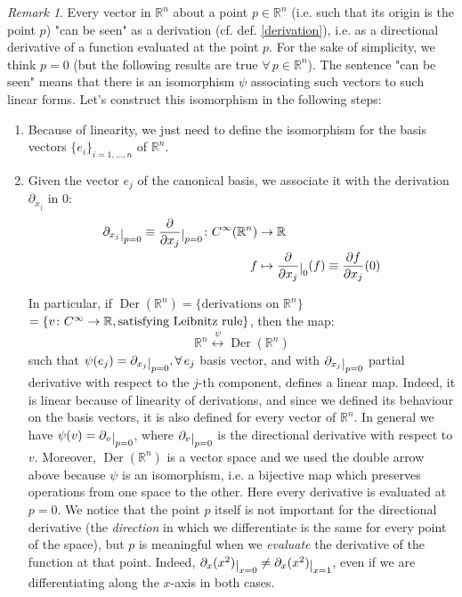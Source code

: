 \documentclass[a4paper,11pt,titlepage]{article}
\numberwithin{equation}{section}
\theoremstyle{definition}
\theoremstyle{remark}
\newtheorem{remark}[theorem]{Remark}
\DeclareMathOperator{\Der}{Der}
\newcommand{\rfield}{\mathbb{R}}
\newcommand{\restrict}[2]{{#1}\raisebox{-.5ex}{$|$}_{#2}}
\begin{document}
\begin{remark}\label{vectorasder}
Every vector in $\rfield^n$ about a point $p \in \rfield^n$ (i.e. such that its origin is the point $p$) "can be seen" as a derivation (cf. def. \ref{derivation}), i.e. as a directional derivative of a function evaluated at the point $p$. For the sake of simplicity, we think $p=0$ (but the following results are true $\forall \, p \in \rfield^n$).
The sentence "can be seen" means that there is an isomorphism $\psi$ associating such vectors to such linear forms. Let's construct this isomorphism in the following steps:

\begin{enumerate}
\item Because of linearity, we just need to define the isomorphism for the basis vectors $\{ e_i \}_{i=1,\ldots,n}$ of $\rfield^n$.
\item Given the vector $e_j$ of the canonical basis, we associate it with the derivation $\partial_{x_j}$ in 0:
\begin{align}
\restrict{\partial_{x_j}}{p=0} \equiv \restrict{\frac{\partial}{\partial x_j}}{p=0} \colon C^{\infty}(\rfield^n) &\rightarrow \rfield \\
f &\mapsto \restrict{\frac{\partial}{\partial x_j}}{0} (f) \equiv \frac{\partial f}{\partial x_j} (0) \nonumber
\end{align}

In particular, if $\Der(\rfield^n) = \{ \text{derivations on }\rfield^n\}$ $ = \{ v\colon C^{\infty}\rightarrow \rfield, \\ \text{satisfying Leibnitz rule}\}$, then the map:
\begin{equation}
   \rfield^n \overset{\psi}{\longleftrightarrow}\Der(\rfield^n)
\end{equation}
such that $\psi(e_j) = \restrict{\partial_{x_j}}{p=0}, \forall \, e_j$ basis vector, and with $\restrict{\partial_{x_j}}{p=0}$ partial derivative with respect to the $j$-th component, defines a linear map. Indeed, it is linear because of linearity of derivations, and since we defined its behaviour on the basis vectors, it is also defined for every vector of $\rfield^n$. In general we have $\psi(v)=\restrict{\partial_{v}}{p=0}$, where $\restrict{\partial_v}{p=0}$ is the directional derivative with respect to $v$. Moreover, $\Der(\rfield^n)$ is a vector space and we used the double arrow above because $\psi$ is an isomorphism, i.e. a bijective map which preserves operations from one space to the other. Here every derivative is evaluated at $p=0$. We notice that the point $p$ itself is not important for the directional derivative (the \textit{direction} in which we differentiate is the same for every point of the space), but $p$ is meaningful when we \textit{evaluate} the derivative of the function at that point. Indeed, $\restrict{\partial_x (x^2)}{x=0} \not = \restrict{\partial_x (x^2)}{x=1}$, even if we are differentiating along the $x$-axis in both cases.
\end{enumerate}



\end{remark}
\end{document}
